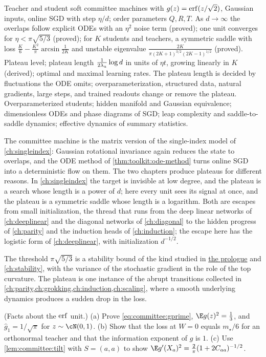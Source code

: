 \begin{refsection}
{Teacher and student soft committee machines with $g(z)=\operatorname{erf}(z/\sqrt2)$, Gaussian inputs, online SGD with step $\eta/d$; order parameters $Q,R,T$.}
{As $d\to\infty$ the overlaps follow explicit ODEs with an $\eta^2$ noise term (proved); one unit converges for $\eta<\pi\sqrt{5/3}$ (proved); for $K$ students and teachers, a symmetric saddle with loss $\frac K6-\frac{K^2}\pi\arcsin\frac1{2K}$ and unstable eigenvalue $\frac{2K}{\pi(2K+1)^{3/2}(2K-1)^{1/2}}$ (proved).}
{Plateau level; plateau length $\frac1{2\lambda_{\mathrm u}}\log d$ in units of $\eta t$, growing linearly in $K$ (derived); optimal and maximal learning rates.}
{The plateau length is decided by fluctuations the ODE omits; overparameterization, structured data, natural gradients, large steps, and trained readouts change or remove the plateau.}
{Overparameterized students; hidden manifold and Gaussian equivalence; dimensionless ODEs and phase diagrams of SGD; leap complexity and saddle-to-saddle dynamics; effective dynamics of summary statistics.}

The committee machine is the matrix version of the single-index model of \cref{ch:singleindex}: Gaussian rotational invariance again reduces the state to overlaps, and the ODE method of \cref{thm:toolkit:ode-method} turns online SGD into a deterministic flow on them. The two chapters produce plateaus for different reasons. In \cref{ch:singleindex} the target is invisible at low degree, and the plateau is a search whose length is a power of $d$; here every unit sees its signal at once, and the plateau is a symmetric saddle whose length is a logarithm. Both are escapes from small initialization, the thread that runs from the deep linear networks of \cref{ch:deeplinear} and the diagonal networks of \cref{ch:diagonal} to the hidden progress of \cref{ch:parity} and the induction heads of \cref{ch:induction}; the escape here has the logistic form of \cref{ch:deeplinear}, with initialization $d^{-1/2}$.

The threshold $\pi\sqrt{5/3}$ is a stability bound of the kind studied in \hyperref[ch:prologue]{the prologue} and \cref{ch:stability}, with the variance of the stochastic gradient in the role of the top curvature. The plateau is one instance of the abrupt transitions collected in \cref{ch:parity,ch:grokking,ch:induction,ch:scaling}, where a smooth underlying dynamics produces a sudden drop in the loss.

\begin{exercises}
\item \consolidation (Facts about the $\operatorname{erf}$ unit.) (a) Prove \eqref{eq:committee:gprime}, $\E g(z)^2=\frac13$, and $\hat g_1=1/\sqrt\pi$ for $z\sim\cN(0,1)$. (b) Show that the loss at $W=0$ equals $m_\star/6$ for an orthonormal teacher and that the information exponent of $g$ is $1$. (c) Use \cref{lem:committee:tilt} with $S=(a,a)$ to show $\E g'(X_a)^2=\frac2\pi(1+2C_{aa})^{-1/2}$.\label{ex:committee:basics}


\end{exercises}
\end{refsection}
